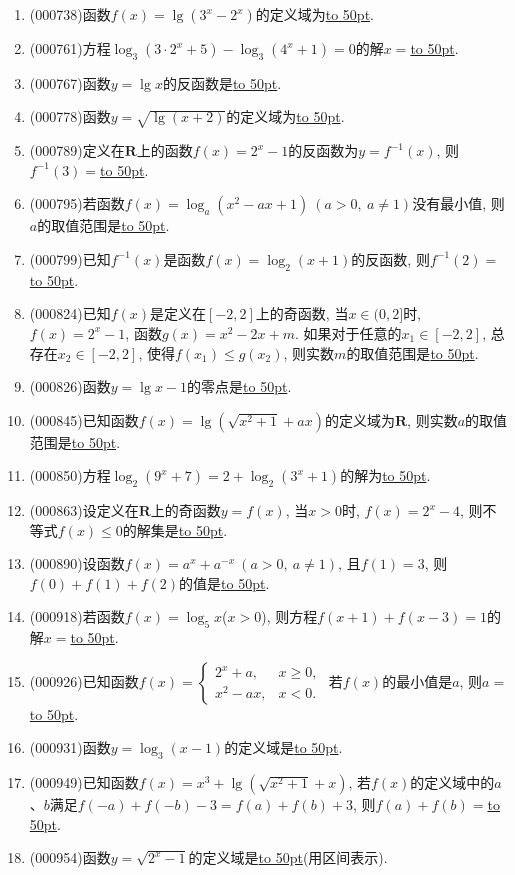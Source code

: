 \documentclass[10pt,a4paper]{article}
\newcommand{\blank}[1]{\underline{\hbox to #1pt{}}}
\begin{document}
\begin{enumerate}[1.]
\item {\tiny (000738)}函数$f(x)=\lg (3^x-2^x)$的定义域为\blank{50}.
\item {\tiny (000761)}方程$\log_3(3 \cdot 2^x+5)-\log_3(4^x+1)=0$的解$x=$\blank{50}.
\item {\tiny (000767)}函数$y=\lg x$的反函数是\blank{50}.
\item {\tiny (000778)}函数$y=\sqrt{\lg(x+2)}$的定义域为\blank{50}.
\item {\tiny (000789)}定义在$\mathbf{R}$上的函数$f(x)=2^x-1$的反函数为$y=f^{-1}(x)$, 则$f^{-1}(3)=$\blank{50}.
\item {\tiny (000795)}若函数$f(x)={\log_a}(x^2-ax+1)\ (a>0, \ a\ne 1)$没有最小值, 则$a$的取值范围是\blank{50}.
\item {\tiny (000799)}已知$f^{-1}(x)$是函数$f(x)=\log_2(x+1)$的反函数, 则$f^{-1}(2)=$\blank{50}.
\item {\tiny (000824)}已知$f(x)$是定义在$[-2,2]$上的奇函数, 当$x\in (0,2]$时,$f(x)=2^x-1$, 函数$g(x)=x^2-2x+m$. 如果对于任意的$x_1\in [-2,2]$, 总存在$x_2\in [-2,2]$, 使得$f(x_1)\le g(x_2)$, 则实数$m$的取值范围是\blank{50}.
\item {\tiny (000826)}函数$y=\lg x-1$的零点是\blank{50}.
\item {\tiny (000845)}已知函数$f(x)=\lg (\sqrt{x^2+1}+ax)$的定义域为$\mathbf{R}$, 则实数$a$的取值范围是\blank{50}.
\item {\tiny (000850)}方程$\log_2(9^x+7)=2+\log_2(3^x+1)$的解为\blank{50}.
\item {\tiny (000863)}设定义在$\mathbf{R}$上的奇函数$y=f(x)$, 当$x>0$时, $f(x)=2^x-4$, 则不等式$f(x)\le 0$的解集是\blank{50}.
\item {\tiny (000890)}设函数$f(x)=a^x+a^{-x}  \ (a>0, \ a\ne 1)$, 且$f(1)=3$, 则$f(0)+f(1)+f(2)$的值是\blank{50}.
\item {\tiny (000918)}若函数$f(x)=\log _5 x$($x>0$), 则方程$f(x+1)+f(x-3)=1$的解$x=$\blank{50}.
\item {\tiny (000926)}已知函数$f(x)=\begin{cases}2^x +a, & x\ge 0, \\ x^2-ax, & x<0.\end{cases}$ 若$f(x)$的最小值是$a$, 则$a=$\blank{50}.
\item {\tiny (000931)}函数$y=\log_3 (x-1)$的定义域是\blank{50}.
\item {\tiny (000949)}已知函数$f(x)={x^3}+\lg (\sqrt{x^2+1}+x)$, 若$f(x)$的定义域中的$a$、$b$满足$f(-a)+f(-b)-3=f(a)+f(b)+3$, 则$f(a)+f(b)=$\blank{50}.
\item {\tiny (000954)}函数$y=\sqrt{2^x-1}$的定义域是\blank{50}(用区间表示).

\end{enumerate}
\end{document}
